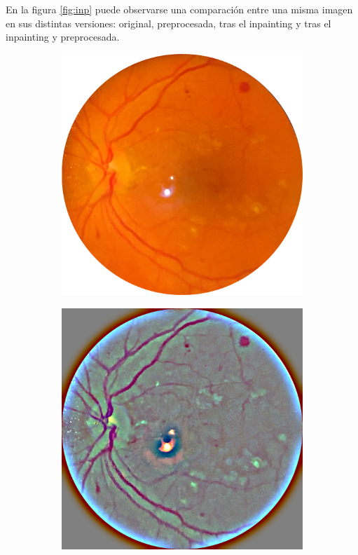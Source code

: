 En la figura \ref{fig:inp} puede observarse una comparación entre una misma imagen en sus distintas versiones: original, preprocesada, tras el inpainting y tras el inpainting y preprocesada.

\begin{figure}[!t]
\centering
\begin{subfigure}[t]{0.45\textwidth}
  \includegraphics[width=\textwidth]{img/iphone.PNG}
\end{subfigure}
\begin{subfigure}[t]{0.45\textwidth}
  \includegraphics[width=\textwidth]{img/iphone_proc.PNG}
\end{subfigure}


\end{figure}
